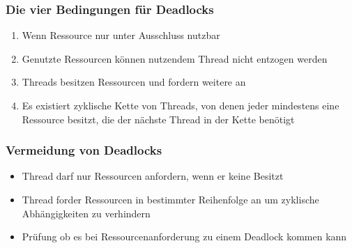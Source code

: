 \begin{frame}[fragile]
	\frametitle{Die vier Bedingungen für Deadlocks}
	\begin{enumerate}
	  \item Wenn Ressource nur unter Ausschluss nutzbar
	  \item Genutzte Ressourcen können nutzendem Thread nicht entzogen werden
	  \item Threads besitzen Ressourcen und fordern weitere an
	  \item Es existiert zyklische Kette von Threads, von denen jeder mindestens
	  eine Ressource besitzt, die der nächste Thread in der Kette benötigt
	\end{enumerate}
\end{frame}

\begin{frame}[fragile]
	\frametitle{Vermeidung von Deadlocks}
	\begin{itemize}
	  \item Thread darf nur Ressourcen anfordern, wenn er keine Besitzt
	  \item Thread forder Ressourcen in bestimmter Reihenfolge an um zyklische
	  Abhängigkeiten zu verhindern
	  \item Prüfung ob es bei Ressourcenanforderung zu einem Deadlock kommen kann
	\end{itemize}
\end{frame}